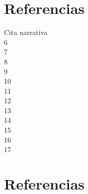 \documentclass{article}
\begin{document}
\setcounter{page}{1}
\section{Referencias}
Cita narrativa \cite{SNarrativa} \\
6 \cite{EF-2} \\
7 \cite{EF-9} \\
8 \cite{EF-7} \\
9 \cite{EF-11} \\
10 \cite{EF-10} \\
11 \cite{EF-19} \\
12 \cite{EF-4} \\
13 \cite{EF-20} \\
14 \cite{EF-2} \\
15 \cite{EF-1} \\
16 \cite{EF-17} \\
17 \cite{Cronograma} \\


\section{Referencias}
\printbibliography
\end{document}
